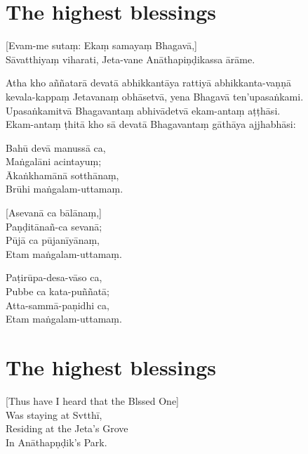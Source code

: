 \clearpage

\chapter{The highest blessings}%

\begin{leader}
\end{leader}

[Evam-me sutaṃ: Ekaṃ samayaṃ Bhagavā,]\\
Sāvatthiyaṃ viharati, Jeta-vane Anāthapiṇḍikassa ārāme.

Atha kho aññatarā devatā abhikkantāya rattiyā abhikkanta-vaṇṇā\\
kevala-kappaṃ Jetavanaṃ obhāsetvā, yena Bhagavā ten’upasaṅkami.\\
Upasaṅkamitvā Bhagavantaṃ abhivādetvā ekam-antaṃ aṭṭhāsi.\\
Ekam-antaṃ ṭhitā kho sā devatā Bhagavantaṃ gāthāya ajjhabhāsi:

Bahū devā manussā ca,\\
Maṅgalāni acintayuṃ;\\
Ākaṅkhamānā sotthānaṃ,\\
Brūhi maṅgalam-uttamaṃ.

[Asevanā ca bālānaṃ,]\\
Paṇḍitānañ-ca sevanā;\\
Pūjā ca pūjanīyānaṃ,\\
Etam maṅgalam-uttamaṃ.

Paṭirūpa-desa-vāso ca,\\
Pubbe ca kata-puññatā;\\
Atta-sammā-paṇidhi ca,\\
Etam maṅgalam-uttamaṃ.

\clearpage

\chapter{The highest blessings}%

\begin{leader}
\end{leader}

[Thus have I heard that the Blssed One]\\
Was staying at Svtthī,\\
Residing at the Jeta's Grove\\
In Anāthapṇḍik's Park.

